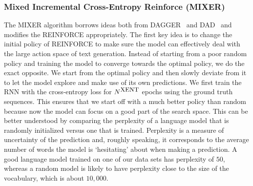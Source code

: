 \subsubsection{Mixed Incremental Cross-Entropy Reinforce (MIXER)} \label{model-mixer}
The MIXER algorithm borrows ideas both from DAGGER~\citep{dagger} and 
DAD~\citep{dad, sbengio-nips2015} and modifies the REINFORCE appropriately. 
The first key idea is to change the initial policy of REINFORCE to make sure
the model can effectively deal with the large action space of text generation.
Instead of starting from a poor random policy and training the model to converge 
towards the optimal policy, we do the exact opposite. We start from the optimal 
policy and then slowly deviate from it to let the model explore and make use 
of its own predictions.
We first train the RNN with the cross-entropy loss for
$N^{\mbox{\small{XENT}}}$ epochs using the ground truth sequences.
This ensures that we start off with a much better policy than random 
because now the model can focus on a good part of the search space.
This can be better understood by comparing the perplexity of a language model 
that is randomly initialized versus one that is trained. Perplexity is a measure of uncertainty of the prediction and, roughly speaking, it corresponds to the average number of words the model is `hesitating' about when making a prediction. A good language model trained on one of our data sets has perplexity of $50$, whereas a random model is likely to have
perplexity close to the size of the vocabulary, which is about $10,000$.
